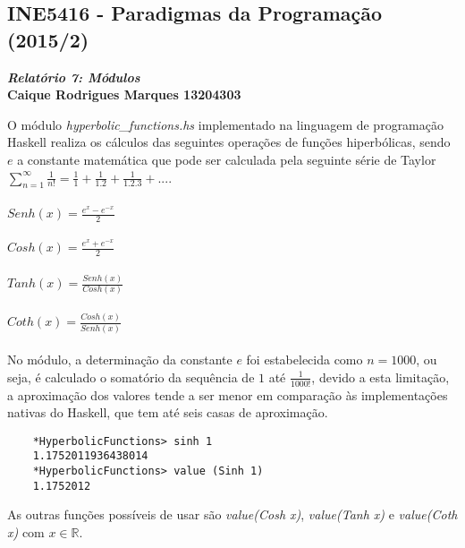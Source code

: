 \documentclass{article}
\begin{document}
    \begin{center}
        \section*{INE5416 - Paradigmas da Programação (2015/2)}
        \textbf{\textit{Relatório 7: Módulos} \\
        Caique Rodrigues Marques 13204303}
    \end{center}

O módulo \textit{hyperbolic\_functions.hs} implementado na linguagem de
programação Haskell realiza os cálculos das seguintes operações de funções
hiperbólicas, sendo $e$ a constante matemática que pode ser calculada pela
seguinte série de Taylor $\sum_{n=1}^{\infty}\frac{1}{n!} = \frac{1}{1} +
\frac{1}{1.2} + \frac{1}{1.2.3} +...$. \\ \\

\noindent
$Senh(x) = \frac{e^{x} - e^{-x}}{2}$ \\ \\
$Cosh(x) = \frac{e^{x} + e^{-x}}{2}$ \\ \\
$Tanh(x) = \frac{Senh(x)}{Cosh(x)}$ \\ \\
$Coth(x) = \frac{Cosh(x)}{Senh(x)}$ \\ \\
    
No módulo, a determinação da constante $e$ foi estabelecida como $n = 1000$, ou
seja, é calculado o somatório da sequência de $1$ até $\frac{1}{1000!}$, devido
a esta limitação, a aproximação dos valores tende a ser menor em comparação às
implementações nativas do Haskell, que tem até seis casas de aproximação.

\begin{verbatim}
    *HyperbolicFunctions> sinh 1
    1.1752011936438014
    *HyperbolicFunctions> value (Sinh 1)
    1.1752012
\end{verbatim}

As outras funções possíveis de usar são \textit{value(Cosh x)},
\textit{value(Tanh x)} e \textit{value(Coth x)} com $x \in \mathbb{R}$.
\end{document}
